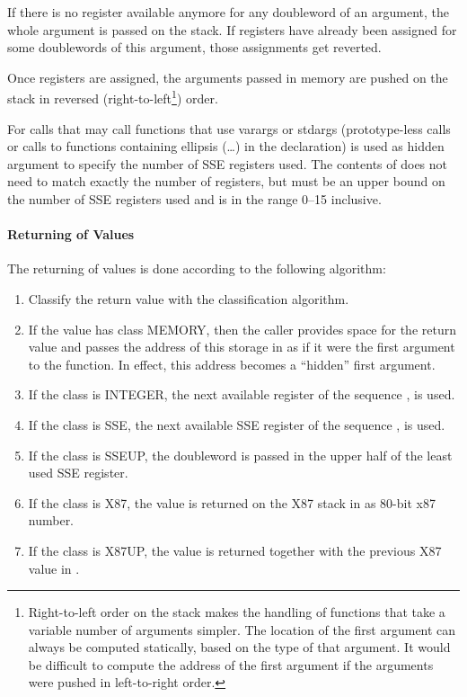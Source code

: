If there is no register available anymore for any doubleword of an
argument, the whole argument is passed on the stack. If registers have
already been assigned for some doublewords of this argument, those
assignments get reverted.

Once registers are assigned, the arguments passed in memory are pushed
on the stack in reversed (right-to-left\footnote{Right-to-left order
  on the stack makes the handling of functions that take a variable
  number of arguments simpler.  The location of the first argument can
  always be computed statically, based on the type of that argument.
  It would be difficult to compute the address of the first argument
  if the arguments were pushed in left-to-right order.}) order.

For calls that may call functions that use varargs or stdargs
(prototype-less calls or calls to functions containing ellipsis
(\dots) in the declaration) \RAX is used as hidden argument to specify
the number of SSE registers used. The contents of \RAX does not need
to match exactly the number of registers, but must be an upper bound
on the number of SSE registers used and is in the range 0--15
inclusive.

\paragraph{Returning of Values}
The returning of values is done according to the following algorithm:
\begin{enumerate}
\item Classify the return value with the classification algorithm.

\item If the value has class MEMORY, then the caller provides space for
   the return value and passes the address of this storage in \RDI as
   if it were the first argument to the function.  In effect, this
   address becomes a ``hidden'' first argument.
   
\item If the class is INTEGER, the next available register of the
   sequence \RAX, \RDX is used.

\item If the class is SSE, the next available SSE register of the
   sequence ,  is used.

\item If the class is SSEUP, the doubleword is passed in the upper half of the
   least used SSE register.

\item If the class is X87, the value is returned on the X87 stack in
    as 80-bit x87 number.

\item If the class is X87UP, the value is returned together with the
   previous X87 value in .
\end{enumerate}

